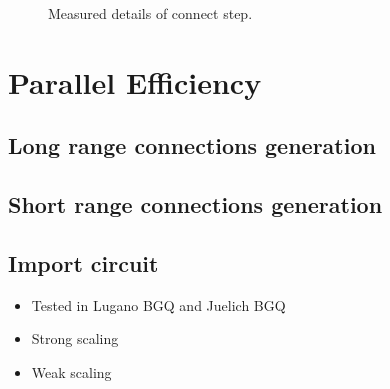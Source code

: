\begin{figure}[ht!]
\begin{center}
{		}
    \end{center}
    \caption{%
        Measured details of connect step.
     }%
   \label{detailnewcon}
\end{figure}



\newpage
\section{Parallel Efficiency}

\subsection{Long range connections generation}
\subsection{Short range connections generation}
\subsection{Import circuit}

\begin{itemize}
      \item Tested in Lugano BGQ and Juelich BGQ
      \item Strong scaling
      \item Weak scaling
\end{itemize}

